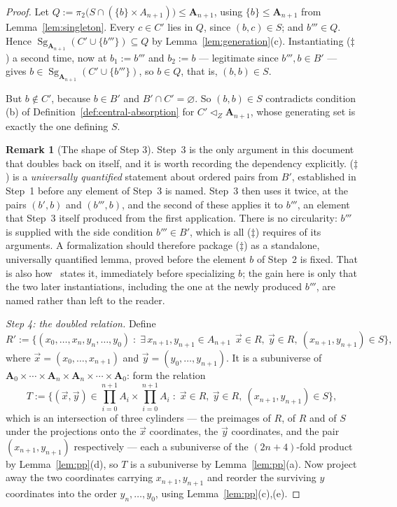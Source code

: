 \documentclass[11pt]{article}
\theoremstyle{mainplain}
\theoremstyle{mainroman}
\theoremstyle{definition}
\newtheorem{remark}[theorem]{Remark}
\numberwithin{equation}{section}
\DeclareMathOperator{\Sg}{Sg}
\newcommand{\bA}{\mathbf A}
\newcommand{\aZ}{\lhd_{Z}}
\begin{document}
\begin{proof}
Let $Q:=\pi_2\bigl(S\cap(\{b\}\times A_{n+1})\bigr)\le\bA_{n+1}$, using
$\{b\}\le\bA_{n+1}$ from Lemma~\ref{lem:singleton}. Every $c\in C'$ lies in $Q$,
since $(b,c)\in S$; and $b'''\in Q$. Hence
$\Sg_{\bA_{n+1}}(C'\cup\{b'''\})\subseteq Q$ by Lemma~\ref{lem:generation}(c).
Instantiating ($\ddagger$) a second time, now at $b_1:=b'''$ and $b_2:=b$ ---
legitimate since $b''',b\in B'$ --- gives
$b\in\Sg_{\bA_{n+1}}(C'\cup\{b'''\})$, so $b\in Q$, that is, $(b,b)\in S$.

But $b\notin C'$, because $b\in B'$ and $B'\cap C'=\varnothing$. So
$(b,b)\in S$ contradicts condition (b) of
Definition~\ref{def:central-absorption} for $C'\aZ\bA_{n+1}$, whose generating
set is exactly the one defining $S$.

\begin{remark}[The shape of Step 3]\label{rem:step3-shape}
Step~3 is the only argument in this document that doubles back on itself, and
it is worth recording the dependency explicitly. ($\ddagger$) is a
\emph{universally quantified} statement about ordered pairs from $B'$,
established in Step~1 before any element of Step~3 is named. Step~3 then uses
it twice, at the pairs $(b',b)$ and $(b''',b)$, and the second of these applies
it to $b'''$, an element that Step~3 itself produced from the first
application. There is no circularity: $b'''$ is supplied with the side
condition $b'''\in B'$, which is all ($\ddagger$) requires of its arguments.
A formalization should therefore package ($\ddagger$) as a standalone,
universally quantified lemma, proved before the element $b$ of Step~2 is fixed.
That is also how~\cite{BradyNotes} states it, immediately before specializing
$b$; the gain here is only that the two later instantiations, including the one
at the newly produced $b'''$, are named rather than left to the reader.
\end{remark}

\emph{Step 4: the doubled relation.} Define
\[
 R':=\bigl\{(x_0,\dots,x_n,y_n,\dots,y_0)\;:\;
   \exists\,x_{n+1},y_{n+1}\in A_{n+1}\ \ \vec x\in R,\ \vec y\in R,\ (x_{n+1},y_{n+1})\in S\bigr\},
\]
where $\vec x=(x_0,\dots,x_{n+1})$ and $\vec y=(y_0,\dots,y_{n+1})$. It is a
subuniverse of $\bA_0\times\cdots\times\bA_n\times\bA_n\times\cdots\times\bA_0$:
form the relation
\[
 T:=\bigl\{(\vec x,\vec y)\in
 \textstyle\prod_{i=0}^{n+1}A_i\times\prod_{i=0}^{n+1}A_i \;:\;
   \vec x\in R,\ \vec y\in R,\ (x_{n+1},y_{n+1})\in S\bigr\},
\]
which is an intersection of three cylinders --- the preimages of $R$, of $R$ and
of $S$ under the projections onto the $\vec x$ coordinates, the $\vec y$
coordinates, and the pair $(x_{n+1},y_{n+1})$ respectively --- each a
subuniverse of the $(2n+4)$-fold product by Lemma~\ref{lem:pp}(d), so
$T$ is a subuniverse by Lemma~\ref{lem:pp}(a). Now project away the two
coordinates carrying $x_{n+1},y_{n+1}$ and reorder the surviving $y$
coordinates into the order $y_n,\dots,y_0$, using Lemma~\ref{lem:pp}(c),(e).


\end{proof}
\end{document}
